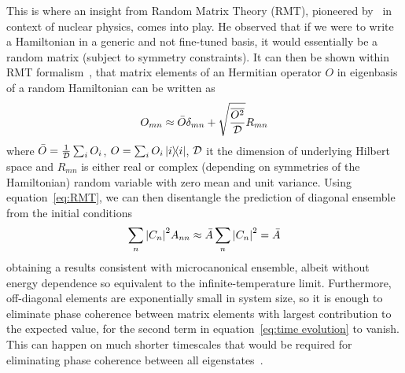 This is where an insight from Random Matrix Theory (RMT), pioneered by~\textcite{Wigner1955}
in context of nuclear physics, comes into play. He observed that if we were to write
a Hamiltonian in a generic and not fine-tuned basis, it would essentially be a random matrix
(subject to symmetry constraints). It can then be shown within RMT formalism~\autocite{mehta2004random},
that matrix elements of an Hermitian operator \(O\) in eigenbasis of a random Hamiltonian 
can be written as
\begin{equation}
    O_{mn} \approx \bar{O}\delta_{mn} + \sqrt{\frac{\overline{O^2}}{\mathcal{D}}}R_{mn}
    \label{eq:RMT}
\end{equation}
where \(\bar{O} = \frac{1}{\mathcal{D}}\sum_i O_i\), \(O = \sum_i O_i \ketbra{i}{i}\), \(\mathcal{D}\)
it the dimension of underlying Hilbert space and \(R_{mn}\) is either real or complex (depending on symmetries of the Hamiltonian) random
variable with zero mean and unit variance. Using equation~\eqref{eq:RMT}, we can then 
disentangle the prediction of diagonal ensemble from the initial conditions
\begin{equation}
    \sum_{n}\abs{C_n}^2 A_{nn} \approx \bar{A}\sum_{n}\abs{C_n}^2 = \bar{A}
\end{equation}
obtaining a results consistent with microcanonical ensemble, albeit without energy dependence
so equivalent to the infinite-temperature limit. Furthermore, off-diagonal elements are exponentially
small in system size, so it is enough to eliminate phase coherence between matrix elements with
largest contribution to the expected value, for the second term in equation~\eqref{eq:time evolution}
to vanish. This can happen on much shorter timescales that would be required for eliminating
phase coherence between all eigenstates~\autocite{DAlessio2016}.

